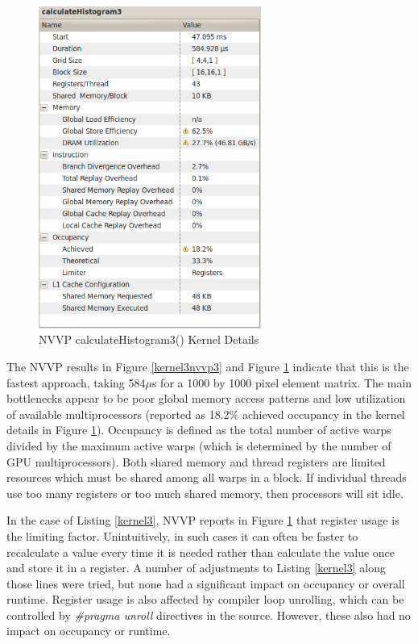 \documentclass{article}
\begin{document}
\begin{figure}
\centering
\includegraphics[width=0.65\textwidth]{screenshots/nvvp/calculateHistogram3_screen4.png}
\caption{NVVP calculateHistogram3() Kernel Details}
\label{kernel3nvvp4}
\end{figure}

The NVVP results in Figure \ref{kernel3nvvp3} and Figure \ref{kernel3nvvp4} indicate that this is the fastest approach, taking 584$\mu$s for a 1000 by 1000 pixel element matrix. The main bottlenecks appear to be poor global memory access patterns and low utilization of available multiprocessors (reported as 18.2\% achieved occupancy in the kernel details in Figure \ref{kernel3nvvp4}). Occupancy is defined as the total number of active warps divided by the maximum active warps (which is determined by the number of GPU multiprocessors). Both shared memory and thread registers are limited resources which must be shared among all warps in a block. If individual threads use too many registers or too much shared memory, then processors will sit idle\cite{occupancy}.

In the case of Listing \ref{kernel3}, NVVP reports in Figure \ref{kernel3nvvp4} that register usage is the limiting factor. Unintuitively, in such cases it can often be faster to recalculate a value every time it is needed rather than calculate the value once and store it in a register. A number of adjustments to Listing \ref{kernel3} along those lines were tried, but none had a significant impact on occupancy or overall runtime. Register usage is also affected by compiler loop unrolling, which can be controlled by \emph{\#pragma unroll} directives in the source. However, these also had no impact on occupancy or runtime.
\end{document}
